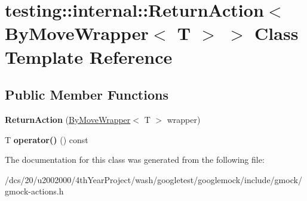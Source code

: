 \hypertarget{classtesting_1_1internal_1_1ReturnAction_3_01ByMoveWrapper_3_01T_01_4_01_4}{}\section{testing\+:\+:internal\+:\+:Return\+Action$<$ By\+Move\+Wrapper$<$ T $>$ $>$ Class Template Reference}
\label{classtesting_1_1internal_1_1ReturnAction_3_01ByMoveWrapper_3_01T_01_4_01_4}
\subsection*{Public Member Functions}
\begin{DoxyCompactItemize}
\item 
\mbox{\label{classtesting_1_1internal_1_1ReturnAction_3_01ByMoveWrapper_3_01T_01_4_01_4_a1f1f1236dbf0c763e3f872931ab4fc08}} 
{\bfseries Return\+Action} (\mbox{\hyperlink{structtesting_1_1internal_1_1ByMoveWrapper}{By\+Move\+Wrapper}}$<$ T $>$ wrapper)
\item 
\mbox{\label{classtesting_1_1internal_1_1ReturnAction_3_01ByMoveWrapper_3_01T_01_4_01_4_ad7845e5c491aa32a5e31202c408afee4}} 
T {\bfseries operator()} () const
\end{DoxyCompactItemize}


The documentation for this class was generated from the following file\+:\begin{DoxyCompactItemize}
\item 
/dcs/20/u2002000/4th\+Year\+Project/wash/googletest/googlemock/include/gmock/gmock-\/actions.\+h\end{DoxyCompactItemize}

